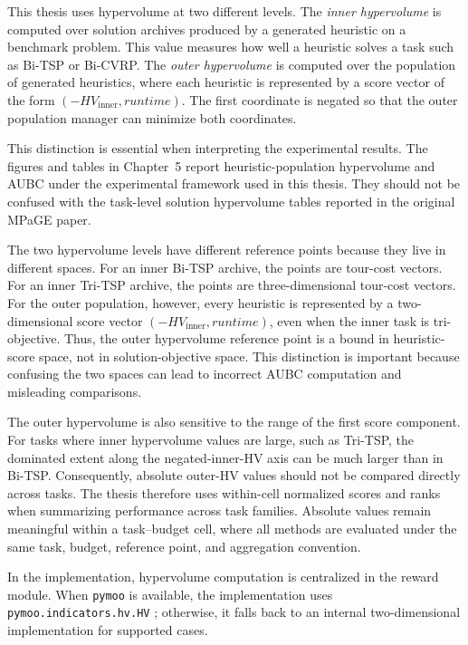 \documentclass[../main.tex]{subfiles}
\begin{document}
This thesis uses hypervolume at two different levels. The \emph{inner hypervolume} is computed over solution archives produced by a generated heuristic on a benchmark problem. This value measures how well a heuristic solves a task such as Bi-TSP or Bi-CVRP. The \emph{outer hypervolume} is computed over the population of generated heuristics, where each heuristic is represented by a score vector of the form $(-HV_{\text{inner}}, runtime)$. The first coordinate is negated so that the outer population manager can minimize both coordinates.

This distinction is essential when interpreting the experimental results. The figures and tables in Chapter~5 report heuristic-population hypervolume and AUBC under the experimental framework used in this thesis. They should not be confused with the task-level solution hypervolume tables reported in the original MPaGE paper.

The two hypervolume levels have different reference points because they live in different spaces. For an inner Bi-TSP archive, the points are tour-cost vectors. For an inner Tri-TSP archive, the points are three-dimensional tour-cost vectors. For the outer population, however, every heuristic is represented by a two-dimensional score vector $(-HV_{\mathrm{inner}}, runtime)$, even when the inner task is tri-objective. Thus, the outer hypervolume reference point is a bound in heuristic-score space, not in solution-objective space. This distinction is important because confusing the two spaces can lead to incorrect AUBC computation and misleading comparisons.

The outer hypervolume is also sensitive to the range of the first score component. For tasks where inner hypervolume values are large, such as Tri-TSP, the dominated extent along the negated-inner-HV axis can be much larger than in Bi-TSP. Consequently, absolute outer-HV values should not be compared directly across tasks. The thesis therefore uses within-cell normalized scores and ranks when summarizing performance across task families. Absolute values remain meaningful within a task--budget cell, where all methods are evaluated under the same task, budget, reference point, and aggregation convention.

In the implementation, hypervolume computation is centralized in the reward module. When \texttt{pymoo} is available, the implementation uses \texttt{pymoo.indicators.hv.HV} \cite{blank2020pymoo}; otherwise, it falls back to an internal two-dimensional implementation for supported cases.
\end{document}

